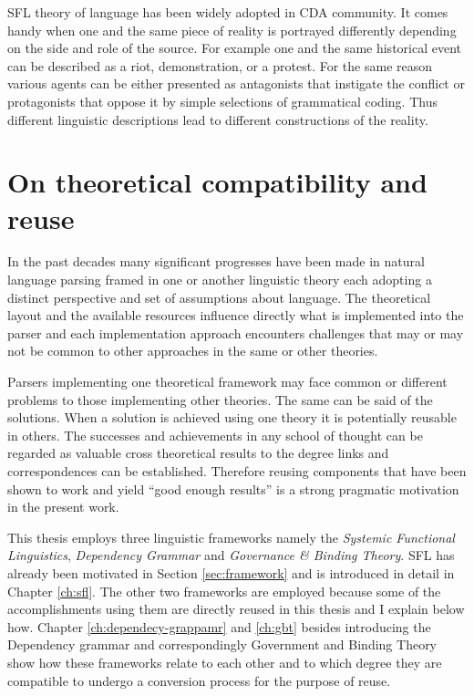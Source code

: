 SFL theory of language has been widely adopted in CDA community. It comes handy when one and the same piece of reality is portrayed differently depending on the side and role of the source. For example one and the same historical event can be described as a riot, demonstration, or a protest. For the same reason various agents can be either presented as antagonists that instigate the conflict or protagonists that oppose it by simple selections of grammatical coding. Thus different linguistic descriptions lead to different constructions of the reality. 


\section{On theoretical compatibility and reuse}
\label{sec:reuse}
In the past decades many significant progresses have been made in natural language parsing framed in one or another linguistic theory each adopting a distinct perspective and set of assumptions about language. The theoretical layout and the available resources influence directly what is implemented into the parser and each implementation approach encounters challenges that may or may not be common to other approaches in the same or other theories. 

Parsers implementing one theoretical framework may face common or different problems to those implementing other theories. The same can be said of the solutions. When a solution is achieved using one theory it is potentially reusable in others. The successes and achievements in any school of thought can be regarded as valuable cross theoretical results to the degree links and correspondences can be established. Therefore reusing components that have been shown to work and yield ``good enough results'' is a strong pragmatic motivation in the present work.

%
This thesis employs three linguistic frameworks namely the \textit{Systemic Functional Linguistics}, \textit{Dependency Grammar} and \textit{Governance \& Binding Theory}. SFL has already been motivated in Section \ref{sec:framework} and is introduced in detail in Chapter \ref{ch:sfl}. The other two frameworks are employed because some of the accomplishments using them are directly reused in this thesis and I explain below how. Chapter \ref{ch:dependecy-grappamr} and \ref{ch:gbt} besides introducing the Dependency grammar and correspondingly Government and Binding Theory show how these frameworks relate to each other and to which degree they are compatible to undergo a conversion process for the purpose of reuse.

